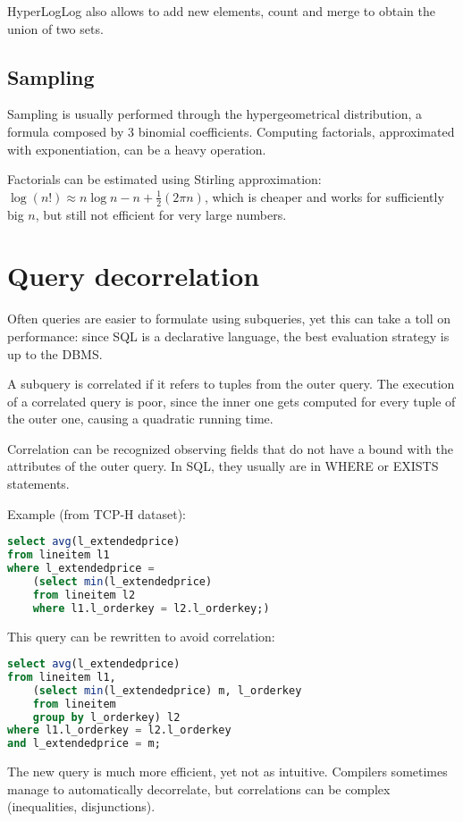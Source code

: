 HyperLogLog also allows to add new elements, count and merge to obtain the union of two sets.

\subsection{Sampling}
Sampling is usually performed through the hypergeometrical distribution, a formula composed by 3 binomial coefficients. Computing factorials, approximated with exponentiation, can be a heavy operation.

Factorials can be estimated using Stirling approximation: $\log(n!) \approx n\log n - n + \frac{1}{2}(2\pi n)$, which is cheaper and works for sufficiently big $n$, but still not efficient for very large numbers.

\section{Query decorrelation}
Often queries are easier to formulate using subqueries, yet this can take a toll on performance: since SQL is a declarative language, the best evaluation strategy is up to the DBMS.

A subquery is correlated if it refers to tuples from the outer query. The execution of a correlated query is poor, since the inner one gets computed for every tuple of the outer one, causing a quadratic running time.

Correlation can be recognized observing fields that do not have a bound with the attributes of the outer query. In SQL, they usually are in WHERE or EXISTS statements.

Example (from TCP-H dataset):
\begin{lstlisting}[language=SQL]
select avg(l_extendedprice)
from lineitem l1
where l_extendedprice =
	(select min(l_extendedprice)
	from lineitem l2
	where l1.l_orderkey = l2.l_orderkey;)
\end{lstlisting}

This query can be rewritten to avoid correlation:
\begin{lstlisting}[language=SQL]
select avg(l_extendedprice)
from lineitem l1,
	(select min(l_extendedprice) m, l_orderkey
	from lineitem
	group by l_orderkey) l2
where l1.l_orderkey = l2.l_orderkey
and l_extendedprice = m;
\end{lstlisting}

The new query is much more efficient, yet not as intuitive. Compilers sometimes manage to automatically decorrelate, but correlations can be complex (inequalities, disjunctions).

